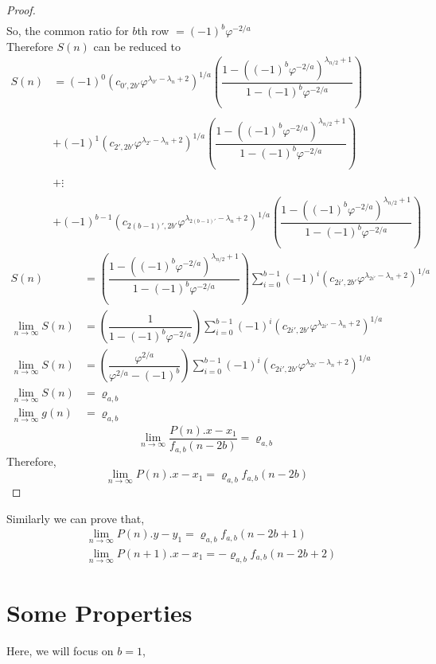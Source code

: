 \documentclass[preprint,12pt]{elsarticle}
\begin{document}
\begin{proof}
\begin{align*}
	\end{align*}
	So, the common ratio for $b$th row $=(-1)^b \varphi^{-2/a}$\\
	Therefore $S(n)$ can be reduced to
	\begin{align*}
		S(n) &=  (-1)^0(c_{0',2b'}\varphi^{\lambda_{0'}-\lambda_{n}+2})^{1/a}\left(\dfrac{1 - ((-1)^b\varphi^{-2/a})^{\lambda_{n/2}+1}}{1-(-1)^b\varphi^{-2/a}}\right)\\\\
		&+(-1)^1(c_{2',2b'}\varphi^{\lambda_{2'}-\lambda_{n}+2})^{1/a}\left(\dfrac{1 - ((-1)^b\varphi^{-2/a})^{\lambda_{n/2}+1}}{1-(-1)^b\varphi^{-2/a}}\right)\\\\
		&+\vdots\\\\
		&+(-1)^{b-1}(c_{2(b-1)',2b'}\varphi^{\lambda_{2(b-1)'}-\lambda_{n}+2})^{1/a}\left(\dfrac{1 - ((-1)^b\varphi^{-2/a})^{\lambda_{n/2}+1}}{1-(-1)^b\varphi^{-2/a}}\right)
	\end{align*}
	\begin{align*}
		S(n) &= \left(\dfrac{1 - ((-1)^b\varphi^{-2/a})^{\lambda_{n/2}+1}}{1-(-1)^b\varphi^{-2/a}}\right)\displaystyle\sum_{i = 0}^{b-1}(-1)^i\left(c_{2i',2b'}\varphi^{\lambda_{2i'}-\lambda_{n}+2}\right)^{1/a}\\
		\lim_{n \to \infty}S(n) &= \left(\dfrac{1}{1-(-1)^b\varphi^{-2/a}}\right)\displaystyle\sum_{i = 0}^{b-1}(-1)^i\left(c_{2i',2b'}\varphi^{\lambda_{2i'}-\lambda_{n}+2}\right)^{1/a}\\
		\lim_{n \to \infty}S(n) &= \left(\dfrac{\varphi^{2/a}}{\varphi^{2/a}-(-1)^b}\right)\displaystyle\sum_{i = 0}^{b-1}(-1)^i\left(c_{2i',2b'}\varphi^{\lambda_{2i'}-\lambda_{n}+2}\right)^{1/a}\\
		\lim_{n \to \infty}S(n) &= \varrho_{a,b}\\
		\lim_{n \to \infty}g(n) &= \varrho_{a,b}
	\end{align*}
	$$
	\lim_{n \to \infty}\dfrac{P(n).x - x_1}{f_{a,b}(n - 2b)} = \varrho_{a,b}$$
	Therefore,
	$$\lim_{n \to \infty} P(n).x - x_1 = \varrho_{a,b}f_{a,b}(n - 2b)$$
\end{proof}
Similarly we can prove that,
\begin{align*}
&\lim_{n \to \infty} P(n).y -y_1 = \varrho_{a,b}f_{a,b}(n-2b+1)\\
&\lim_{n \to \infty} P(n+1).x -x_1 = -\varrho_{a,b}f_{a,b}(n-2b+2)
\end{align*}
\section{Some Properties}
Here, we will focus on $b =1$,\\
\end{document}
